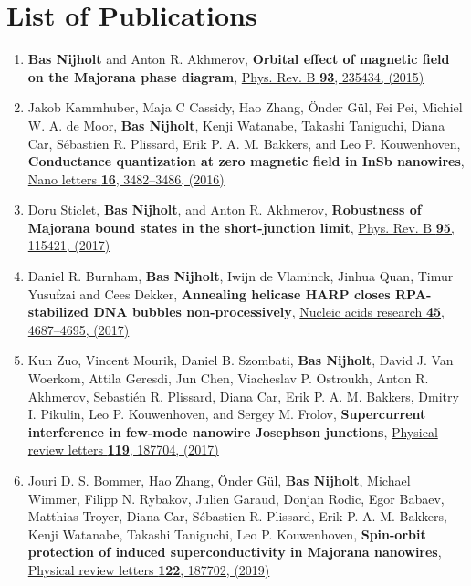 \chapter*{List of Publications}
\label{publications}

\begin{enumerate}

\item \textbf{Bas Nijholt} and Anton R. Akhmerov, \textbf{Orbital effect of magnetic field on the Majorana phase diagram}, \href{}{Phys. Rev. B \textbf{93}, 235434, (2015)}

\item Jakob Kammhuber, Maja C Cassidy, Hao Zhang, {\"O}nder G{\"u}l, Fei Pei, Michiel W. A. de Moor, \textbf{Bas Nijholt}, Kenji Watanabe, Takashi Taniguchi, Diana Car, S{\'e}bastien R. Plissard, Erik P. A. M. Bakkers, and Leo P. Kouwenhoven, \textbf{Conductance quantization at zero magnetic field in InSb nanowires}, \href{}{Nano letters \textbf{16}, 3482--3486, (2016)}

\item Doru Sticlet, \textbf{Bas Nijholt}, and Anton R. Akhmerov, \textbf{Robustness of Majorana bound states in the short-junction limit}, \href{}{Phys. Rev. B \textbf{95}, 115421, (2017)}

\item Daniel R. Burnham, \textbf{Bas Nijholt}, Iwijn de Vlaminck,  Jinhua Quan, Timur Yusufzai and Cees Dekker, \textbf{Annealing helicase HARP closes RPA-stabilized DNA bubbles non-processively}, \href{}{Nucleic acids research \textbf{45}, 4687--4695, (2017)}

\item Kun Zuo, Vincent Mourik, Daniel B. Szombati, \textbf{Bas Nijholt}, David J. Van Woerkom, Attila Geresdi, Jun Chen, Viacheslav P. Ostroukh, Anton R. Akhmerov, Sebasti{\'e}n R. Plissard, Diana Car, Erik P. A. M. Bakkers, Dmitry I. Pikulin, Leo P. Kouwenhoven, and Sergey M. Frolov, \textbf{Supercurrent interference in few-mode nanowire Josephson junctions}, \href{}{Physical review letters \textbf{119}, 187704, (2017)}

\item Jouri D. S. Bommer, Hao Zhang, {\"O}nder G{\"u}l, \textbf{Bas Nijholt}, Michael Wimmer, Filipp N. Rybakov, Julien Garaud, Donjan Rodic, Egor Babaev, Matthias Troyer, Diana Car, S{\'e}bastien R. Plissard, Erik P. A. M. Bakkers, Kenji Watanabe, Takashi Taniguchi, Leo P. Kouwenhoven, \textbf{Spin-orbit protection of induced superconductivity in Majorana nanowires}, \href{}{Physical review letters \textbf{122}, 187702, (2019)}


\end{enumerate}
